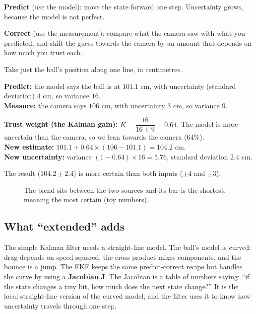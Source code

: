 \documentclass[11pt,a4paper]{article}
\begin{document}
\textbf{Predict} (use the model): move the state forward one step. Uncertainty grows, because the
model is not perfect.

\textbf{Correct} (use the measurement): compare what the camera saw with what you predicted,
and shift the guess towards the camera by an amount that depends on how much you trust each.

\begin{toy}
Take just the ball's position along one line, in centimetres.

\textbf{Predict:} the model says the ball is at $101.1$ cm, with uncertainty (standard deviation)
$4$ cm, so variance $16$.\\
\textbf{Measure:} the camera says $106$ cm, with uncertainty $3$ cm, so variance $9$.

\textbf{Trust weight (the Kalman gain):} $K=\dfrac{16}{16+9}=0.64$. The model is more
uncertain than the camera, so we lean towards the camera ($64\%$).\\
\textbf{New estimate:} $101.1+0.64\times(106-101.1)=104.2$ cm.\\
\textbf{New uncertainty:} variance $(1-0.64)\times 16=5.76$, standard deviation $2.4$ cm.

The result ($104.2\pm2.4$) is more certain than both inputs ($\pm4$ and $\pm3$).
\end{toy}

\begin{figure}[htbp]
\centering
{}
\caption{The blend sits between the two sources and its bar is the shortest, meaning the most
certain (toy numbers).}
\end{figure}

\subsection{What ``extended'' adds}
The simple Kalman filter needs a straight-line model. The ball's model is curved: drag depends on
speed squared, the cross product mixes components, and the bounce is a jump. The EKF keeps the
same predict-correct recipe but handles the curve by using a \textbf{Jacobian} $\mathbf J$.
The Jacobian is a table of numbers saying: ``if the state changes a tiny bit, how much does the
next state change?'' It is the local straight-line version of the curved model, and the filter
uses it to know how uncertainty travels through one step.
\end{document}
